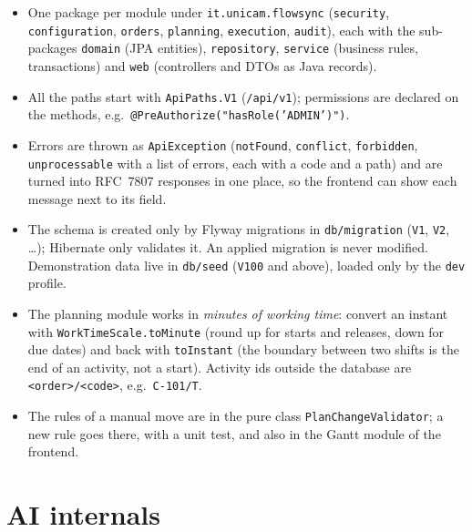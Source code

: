 \begin{itemize}
  \item One package per module under \texttt{it.unicam.flowsync}
        (\texttt{security}, \texttt{configuration}, \texttt{orders}, \texttt{planning},
        \texttt{execution}, \texttt{audit}), each with the sub-packages \texttt{domain} (JPA
        entities), \texttt{repository}, \texttt{service} (business rules, transactions) and
        \texttt{web} (controllers and DTOs as Java records).
  \item All the paths start with \texttt{ApiPaths.V1} (\texttt{/api/v1}); permissions are
        declared on the methods, e.g.\ \texttt{@PreAuthorize("hasRole('ADMIN')")}.
  \item Errors are thrown as \texttt{ApiException} (\texttt{notFound}, \texttt{conflict},
        \texttt{forbidden}, \texttt{unprocessable} with a list of errors, each with a code and a
        path) and are turned into RFC~7807 responses in one place, so the frontend can show each
        message next to its field.
  \item The schema is created only by Flyway migrations in \texttt{db/migration}
        (\texttt{V1}, \texttt{V2}, \dots); Hibernate only validates it. An applied migration is
        never modified. Demonstration data live in \texttt{db/seed} (\texttt{V100} and above),
        loaded only by the \texttt{dev} profile.
  \item The planning module works in \emph{minutes of working time}: convert an instant with
        \texttt{WorkTimeScale.toMinute} (round up for starts and releases, down for due dates)
        and back with \texttt{toInstant} (the boundary between two shifts is the end of an
        activity, not a start). Activity ids outside the database are
        \texttt{<order>/<code>}, e.g.\ \texttt{C-101/T}.
  \item The rules of a manual move are in the pure class \texttt{PlanChangeValidator}; a new rule
        goes there, with a unit test, and also in the Gantt module of the frontend.
\end{itemize}

\section{AI internals}
\label{sec:dev-ai}

